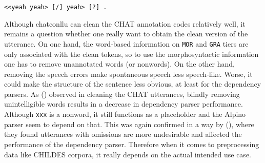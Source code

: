 \texttt{<<yeah yeah> [/] yeah> [?] .}

Although chatconllu can clean the CHAT annotation codes relatively well, it remains a question whether one really want to obtain the clean version of the utterance. On one hand, the word-based information on \texttt{MOR} and \texttt{GRA} tiers are only associated with the clean tokens, so to use the morphosyntactic information one has to remove unannotated words (or nonwords). On the other hand, removing the speech errors make spontaneous speech less speech-like. Worse, it could make the structure of the sentence less obvious, at least for the dependency parsers. As (\cite{odijk2018anncor}) observed in cleaning the CHAT utterances, blindly removing unintelligible words results in a decrease in dependency parser performance. Although \texttt{xxx} is a nonword, it still functions as a placeholder  and the Alpino parser seem to depend on that. This was again confirmed in a way by (\cite{liu2021}), where they found utterances with omissions are more undesirable and affected the performance of the dependency parser. Therefore when it comes to preprocessing data like CHILDES corpora, it really depends on the actual intended use case.
